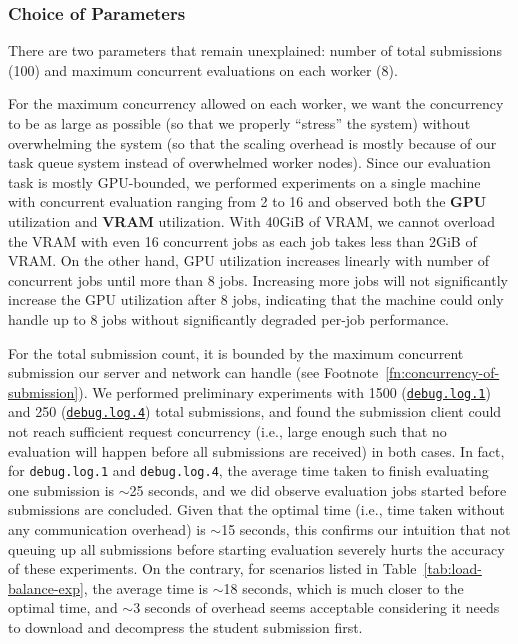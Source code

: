 \subsubsection{Choice of Parameters}
\label{sss:choice-of-params}

There are two parameters that remain unexplained: number of total submissions (100) and maximum concurrent evaluations on each worker (8).

For the maximum concurrency allowed on each worker, we want the concurrency to be as large as possible (so that we properly ``stress'' the system) without overwhelming the system (so that the scaling overhead is mostly because of our task queue system instead of overwhelmed worker nodes). Since our evaluation task is mostly GPU-bounded, we performed experiments on a single machine with concurrent evaluation ranging from 2 to 16 and observed both the \textbf{GPU} utilization and \textbf{VRAM} utilization. With 40GiB of VRAM, we cannot overload the VRAM with even 16 concurrent jobs as each job takes less than 2GiB of VRAM. On the other hand, GPU utilization increases linearly with number of concurrent jobs until more than 8 jobs. Increasing more jobs will not significantly increase the GPU utilization after 8 jobs, indicating that the machine could only handle up to 8 jobs without significantly degraded per-job performance.

For the total submission count, it is bounded by the maximum concurrent submission our server and network can handle (see Footnote~\ref{fn:concurrency-of-submission}). We performed preliminary experiments with 1500 (\href{https://github.com/edu-ai/aivle-experiment-logs/blob/main/web/debug.log.1}{\texttt{debug.log.1}}) and 250 (\href{https://github.com/edu-ai/aivle-experiment-logs/blob/main/web/debug.log.4}{\texttt{debug.log.4}}) total submissions, and found the submission client could not reach sufficient request concurrency (i.e., large enough such that no evaluation will happen before all submissions are received) in both cases. In fact, for \texttt{debug.log.1} and \texttt{debug.log.4}, the average time taken to finish evaluating one submission is $\sim$25 seconds, and we did observe evaluation jobs started before submissions are concluded. Given that the optimal time (i.e., time taken without any communication overhead) is $\sim$15 seconds, this confirms our intuition that not queuing up all submissions before starting evaluation severely hurts the accuracy of these experiments. On the contrary, for scenarios listed in Table~\ref{tab:load-balance-exp}, the average time is $\sim$18 seconds, which is much closer to the optimal time, and $\sim$3 seconds of overhead seems acceptable considering it needs to download and decompress the student submission first.


